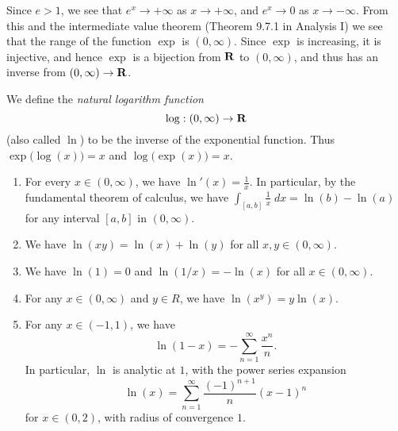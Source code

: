 \begin{note}
  Since \(e > 1\), we see that \(e^x \to +\infty\) as \(x \to +\infty\), and \(e^x \to 0\) as \(x \to -\infty\).
  From this and the intermediate value theorem (Theorem 9.7.1 in Analysis I) we see that the range of the function \(\exp\) is \((0, \infty)\).
  Since \(\exp\) is increasing, it is injective, and hence \(\exp\) is a bijection from \(\mathbf{R}\) to \((0, \infty)\), and thus has an inverse from \((0, \infty) \to \mathbf{R}\).
\end{note}

\begin{definition}[Logarithm]\label{4.5.5}
  We define the \emph{natural logarithm function}
  \[
    \log : (0, \infty) \to \mathbf{R}
  \]
  (also called \(\ln\)) to be the inverse of the exponential function.
  Thus \(\exp\big(\log(x)\big) = x\) and \(\log\big(\exp(x)\big) = x\).
\end{definition}

\begin{theorem}\label{4.5.6}
  \quad
  \begin{enumerate}
    \item For every \(x \in (0, \infty)\), we have \(\ln'(x) = \frac{1}{x}\).
          In particular, by the fundamental theorem of calculus, we have \(\int_{[a, b]} \frac{1}{x} \; dx = \ln(b) - \ln(a)\) for any interval \([a, b]\) in \((0, \infty)\).
    \item We have \(\ln(xy) = \ln(x) + \ln(y)\) for all \(x, y \in (0, \infty)\).
    \item We have \(\ln(1) = 0\) and \(\ln(1 / x) = -\ln(x)\) for all \(x \in (0, \infty)\).
    \item For any \(x \in (0, \infty)\) and \(y \in R\), we have \(\ln(x^y) = y \ln(x)\).
    \item For any \(x \in (-1, 1)\), we have
          \[
            \ln(1 - x) = - \sum_{n = 1}^\infty \frac{x^n}{n}.
          \]
          In particular, \(\ln\) is analytic at \(1\), with the power series expansion
          \[
            \ln(x) = \sum_{n = 1}^\infty \frac{(-1)^{n + 1}}{n} (x - 1)^n
          \]
          for \(x \in (0, 2)\), with radius of convergence \(1\).
  \end{enumerate}
\end{theorem}

